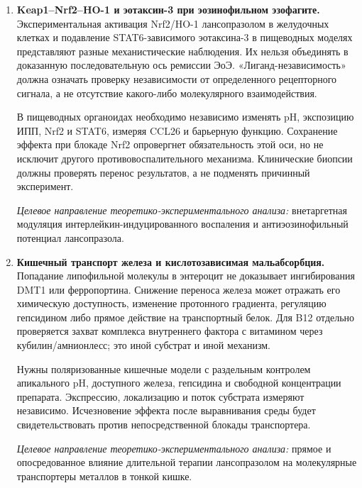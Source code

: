 \documentclass[11pt,a4paper,notitlepage]{report}
\newcommand{\src}[1]{\unskip\space\cite{#1}}
\begin{document}
\begin{enumerate}[label=\textbf{\arabic*.},start=12,leftmargin=*,itemsep=0.9\baselineskip]
\textit{Целевое направление теоретико-экспериментального анализа:} молекулярные взаимодействия при двойной антитромбоцитарной терапии и оценка совокупного ингибирования цитохромов сопутствующими препаратами.

\item \textbf{Keap1--Nrf2--HO-1 и эотаксин-3 при эозинофильном эзофагите.} Экспериментальная активация Nrf2/HO-1 лансопразолом в желудочных клетках и подавление STAT6-зависимого эотаксина-3 в пищеводных моделях представляют разные механистические наблюдения. Их нельзя объединять в доказанную последовательную ось ремиссии ЭоЭ. «Лиганд-независимость» должна означать проверку независимости от определенного рецепторного сигнала, а не отсутствие какого-либо молекулярного взаимодействия.\src{molnrf2,eoestat6,eoe}

В пищеводных органоидах необходимо независимо изменять pH, экспозицию ИПП, Nrf2 и STAT6, измеряя CCL26 и барьерную функцию. Сохранение эффекта при блокаде Nrf2 опровергнет обязательность этой оси, но не исключит другого противовоспалительного механизма. Клинические биопсии должны проверять перенос результатов, а не подменять причинный эксперимент.

\textit{Целевое направление теоретико-экспериментального анализа:} внетаргетная модуляция интерлейкин-индуцированного воспаления и антиэозинофильный потенциал лансопразола.

\item \textbf{Кишечный транспорт железа и кислотозависимая мальабсорбция.} Попадание липофильной молекулы в энтероцит не доказывает ингибирования DMT1 или ферропортина. Снижение переноса железа может отражать его химическую доступность, изменение протонного градиента, регуляцию гепсидином либо прямое действие на транспортный белок. Для B12 отдельно проверяется захват комплекса внутреннего фактора с витамином через кубилин/амнионлесс; это иной субстрат и иной механизм.\src{safeiron,futurecubam2005,pharmalabel}

Нужны поляризованные кишечные модели с раздельным контролем апикального pH, доступного железа, гепсидина и свободной концентрации препарата. Экспрессию, локализацию и поток субстрата измеряют независимо. Исчезновение эффекта после выравнивания среды будет свидетельствовать против непосредственной блокады транспортера.

\textit{Целевое направление теоретико-экспериментального анализа:} прямое и опосредованное влияние длительной терапии лансопразолом на молекулярные транспортеры металлов в тонкой кишке.


\end{enumerate}
\end{document}
